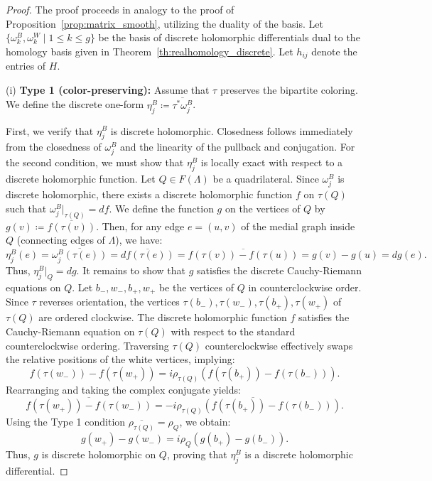 \documentclass[10pt,a4paper]{amsart}
\begin{document}
\begin{proof}
	The proof proceeds in analogy to the proof of Proposition~\ref{prop:matrix_smooth}, utilizing the duality of the basis. Let $\{\omega_k^B,\omega_k^W \mid 1 \leq k \leq g\}$ be the basis of discrete holomorphic differentials dual to the homology basis given in Theorem~\ref{th:realhomology_discrete}. Let $h_{ij}$ denote the entries of $H$.
	
	(i) \textbf{Type 1 (color-preserving):} Assume that $\tau$ preserves the bipartite coloring. We define the discrete one-form $\eta_j^B \coloneq \overline{\tau^* \omega_j^B}$.
	
	First, we verify that $\eta_j^B$ is discrete holomorphic. Closedness follows immediately from the closedness of $\omega_j^B$ and the linearity of the pullback and conjugation. For the second condition, we must show that $\eta_j^B$ is locally exact with respect to a discrete holomorphic function.
	Let $Q \in F(\Lambda)$ be a quadrilateral. Since $\omega_j^B$ is discrete holomorphic, there exists a discrete holomorphic function $f$ on $\tau(Q)$ such that $\omega_j^B|_{\tau(Q)} = df$. We define the function $g$ on the vertices of $Q$ by $g(v) \coloneqq \overline{f(\tau(v))}$. Then, for any edge $e=(u,v)$ of the medial graph inside $Q$ (connecting edges of $\Lambda$), we have:
	\[
	\eta_j^B(e) = \overline{\omega_j^B(\tau(e))} = \overline{df(\tau(e))} = \overline{f(\tau(v)) - f(\tau(u))} = g(v) - g(u) = dg(e).
	\]
	Thus, $\eta_j^B|_Q = dg$. It remains to show that $g$ satisfies the discrete Cauchy-Riemann equations on $Q$. Let $b_-, w_-, b_+, w_+$ be the vertices of $Q$ in counterclockwise order. Since $\tau$ reverses orientation, the vertices $\tau(b_-), \tau(w_-), \tau(b_+), \tau(w_+)$ of $\tau(Q)$ are ordered clockwise. The discrete holomorphic function $f$ satisfies the Cauchy-Riemann equation on $\tau(Q)$ with respect to the standard counterclockwise ordering. Traversing $\tau(Q)$ counterclockwise effectively swaps the relative positions of the white vertices, implying:
	\[
	f(\tau(w_-)) - f(\tau(w_+)) = i \rho_{\tau(Q)} (f(\tau(b_+)) - f(\tau(b_-))).
	\]
	Rearranging and taking the complex conjugate yields:
	\[
	\overline{f(\tau(w_+)) - f(\tau(w_-))} = \overline{- i \rho_{\tau(Q)} (f(\tau(b_+)) - f(\tau(b_-)))}.
	\]
	Using the Type 1 condition $\overline{\rho_{\tau(Q)}} = \rho_Q$, we obtain:
	\[
	g(w_+) - g(w_-) = i \rho_Q (g(b_+) - g(b_-)).
	\]
	Thus, $g$ is discrete holomorphic on $Q$, proving that $\eta_j^B$ is a discrete holomorphic differential.
	

\end{proof}
\end{document}
